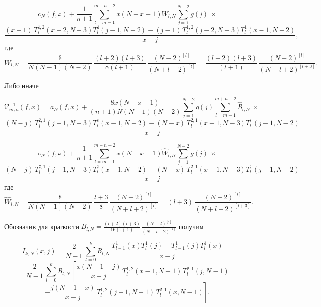 \documentclass[12pt]{book}
\begin{document}
\begin{equation*}
  a_N(f,x) + \frac{1}{n+1}
   \sum_{l=m-1}^{m+n-2} x(N-x-1) W_{l,N} \sum_{j=1}^{N-2} g(j)
  \,\times
\end{equation*}
\begin{equation*}
  \frac{(x-1)\,T^{1,2}_{l}(x-2,N-3) T_{l}^1(j-1,N-2) - (j-1)\,T^{1,2}_{l}(j-2,N-3) T_{l}^1(x-1,N-2)}{x-j},
\end{equation*}
где
\begin{equation*}
 W_{l,N} = \frac{8}{N(N-1)(N-2)} \, \frac{(l+2)(l+3)}{8(l+1)}\, \frac{(N-2)^{[l]}}{(N+l+2)^{[l]}}
=
 \frac{(l+2)(l+3)}{(l+1)}\, \frac{(N-2)^{[l]}}{(N+l+2)^{[l+3]}}.
\end{equation*}

Либо иначе

\begin{equation*}
  \mathcal{V}^{-1}_{m,n}(f,x) = a_N(f,x) +
   \frac{8x(N-x-1)}{(n+1)N(N-1)(N-2)}
   \sum_{j=1}^{N-2} g(j) \sum_{l=m-1}^{m+n-2}
  \hat{B}_{l,N}\,\times
\end{equation*}
\begin{equation*}
  \frac{(N-j)\,T^{2,1}_{l}(j-1,N-3) T_{l}^1(x-1,N-2) - (N-x)\,T^{2,1}_{l}(x-1,N-3) T_{l}^1(j-1,N-2)}{x-j} =
\end{equation*}

\begin{equation*}
  a_N(f,x) + \frac{1}{n+1}
   \sum_{l=m-1}^{m+n-2} x(N-x-1) \hat{W}_{l,N} \sum_{j=1}^{N-2} g(j)
  \,\times
\end{equation*}
\begin{equation*}
  \frac{(N-j)\,T^{2,1}_{l}(j-1,N-3) T_{l}^1(x-1,N-2) - (N-x)\,T^{2,1}_{l}(x-1,N-3) T_{l}^1(j-1,N-2)}{x-j},
\end{equation*}
где
\begin{equation*}
 \hat{W}_{l,N} = \frac{8}{N(N-1)(N-2)} \, \frac{l+3}{8} \,\frac{(N-2)^{[l]}}{(N+l+2)^{[l]}} =
 (l+3)\,\frac{(N-2)^{[l]}}{(N+l+2)^{[l+3]}}.
\end{equation*}







\newpage
\newpage

Обозначив для краткости $B_{l,N} = \frac{(l+2)(l+3)}{16(l+1)}\,\frac{(N-2)^{[l]}}{(N+l+2)^{[l]}} $
получим

\begin{equation*}
  I_{k,N}(x,j) = \frac{2}{N-1}\,
  \sum_{l=0}^{k} B_{l,N}\,
  \frac{T_{l+1}^1(x) T_{l}^1(j) - T_{l+1}^1(j) T_{l}^1(x)}{x-j} =
\end{equation*}
\begin{equation*}
  \frac{2}{N-1}\,\sum_{l=0}^{k} B_{l,N}\, \left[
    \frac{x(N-1-j)}{x-j}\,T^{1,2}_{l}(x-1,N-1)\,T^{2,1}_{l}(j,N-1)
  \right.
\end{equation*}
\begin{equation*}
\left.
  - \frac{j(N-1-x)}{x-j}\,T^{1,2}_{l}(j-1,N-1)\,T^{2,1}_{l}(x,N-1)
\right].
\end{equation*}
\end{document}
